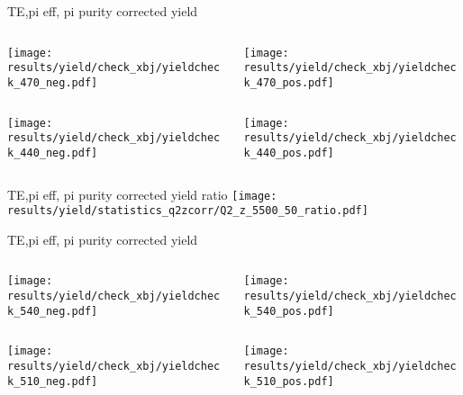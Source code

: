 \begin{frame}{TE,pi eff, pi purity corrected yield}
\begin{columns}
\begin{column}[T]{0.5\textwidth}
\texttt{[image: results/yield/check\_xbj/yieldcheck\_470\_neg.pdf]}
\end{column}
\begin{column}[T]{0.5\textwidth}
\texttt{[image: results/yield/check\_xbj/yieldcheck\_470\_pos.pdf]}
\end{column}
\end{columns}
\begin{columns}
\begin{column}[T]{0.5\textwidth}
\texttt{[image: results/yield/check\_xbj/yieldcheck\_440\_neg.pdf]}
\end{column}
\begin{column}[T]{0.5\textwidth}
\texttt{[image: results/yield/check\_xbj/yieldcheck\_440\_pos.pdf]}
\end{column}
\end{columns}
\end{frame}
\begin{frame}{TE,pi eff, pi purity corrected yield ratio}
\texttt{[image: results/yield/statistics\_q2zcorr/Q2\_z\_5500\_50\_ratio.pdf]}
\end{frame}
\begin{frame}{TE,pi eff, pi purity corrected yield}
\begin{columns}
\begin{column}[T]{0.5\textwidth}
\texttt{[image: results/yield/check\_xbj/yieldcheck\_540\_neg.pdf]}
\end{column}
\begin{column}[T]{0.5\textwidth}
\texttt{[image: results/yield/check\_xbj/yieldcheck\_540\_pos.pdf]}
\end{column}
\end{columns}
\begin{columns}
\begin{column}[T]{0.5\textwidth}
\texttt{[image: results/yield/check\_xbj/yieldcheck\_510\_neg.pdf]}
\end{column}
\begin{column}[T]{0.5\textwidth}
\texttt{[image: results/yield/check\_xbj/yieldcheck\_510\_pos.pdf]}
\end{column}
\end{columns}
\end{frame}
